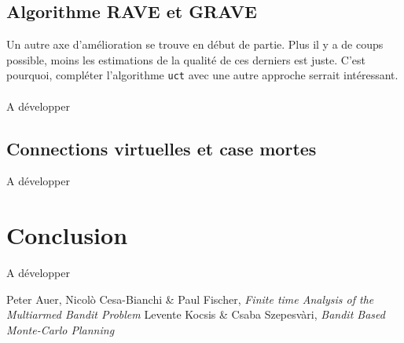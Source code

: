 \documentclass[a4paper]{article}
\theoremstyle{definition}
\begin{document}
\subsection{Algorithme RAVE et GRAVE}

Un autre axe d'amélioration se trouve en début de partie. Plus il y a de coups possible, moins les estimations de la qualité de ces derniers est juste. C'est pourquoi, compléter l'algorithme \texttt{uct} avec une autre approche serrait intéressant.\\
\\
A développer

\subsection{Connections virtuelles et case mortes}

A développer
\newpage

\section{Conclusion}

A développer

\newpage

\listoffigures 

\newpage

%
\begin{thebibliography}{9}

Peter Auer, Nicol\`o Cesa-Bianchi \& Paul Fischer, {\em Finite time Analysis of the Multiarmed Bandit Problem}
Levente Kocsis \& Csaba Szepesv\`ari, {\em Bandit Based Monte-Carlo Planning}

\end{thebibliography}
\end{document}
